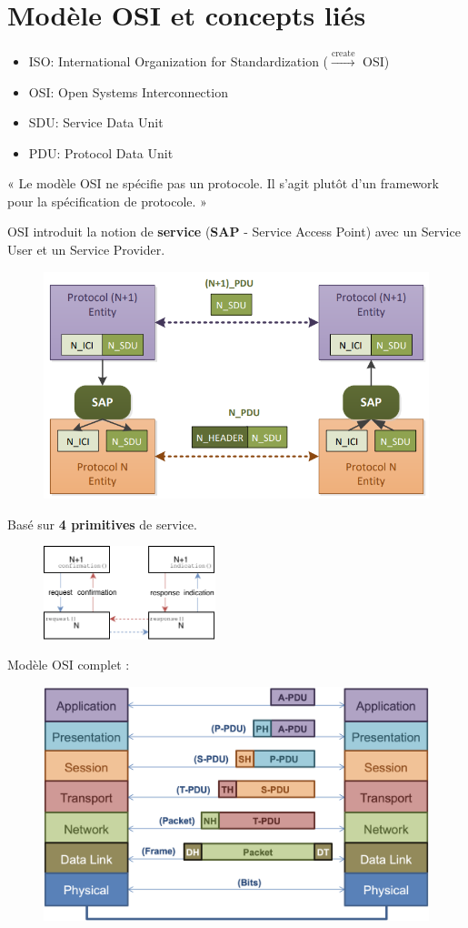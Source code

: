 \section{Modèle OSI et concepts liés}
\begin{itemize}
    \item ISO: International Organization for Standardization ($\xrightarrow{\text{create}}$ OSI)
    \item OSI: Open Systems Interconnection
    \item SDU: Service Data Unit
    \item PDU: Protocol Data Unit
\end{itemize}
« Le modèle OSI ne spécifie pas un protocole. Il s'agit plutôt d'un framework pour la spécification de protocole. »

OSI introduit la notion de \textbf{service} (\textbf{SAP} - Service Access Point) avec un \textcolor{Periwinkle}{Service User} et un \textcolor{BurntOrange}{Service Provider}.
\begin{figure}[H]
    \centering
    \includegraphics[width=.8\linewidth]{figures/OSI_SAP.png}
\end{figure}

Basé sur \textbf{4 primitives} de service.
\begin{figure}[H]
    \centering
    \includegraphics[width=5cm]{figures/4primitives.pdf}
\end{figure}

Modèle OSI complet :
\begin{figure}[H]
    \centering
    \includegraphics[width=.7\linewidth]{figures/OSI_model_operation.png}
\end{figure}
